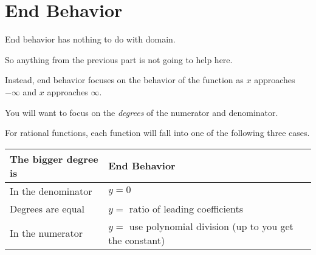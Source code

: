 %

\iffalse 

(a) 
Domain: $x \neq -7, 2$
Hole @ (2, 11/9)
Vertical asymptote: $x = -7$

(b)
Domain: $x \neq 1/2, -4/5$
Hole @ (1/2, 7/26)
Vertical asymptote: $x = -4/5$

(c)
Domain: $x \neq 0, -3, 9$
No holes
Vertical asymptotes: $x = 0$, $x = -3$, $x = 9$

\fi 

\section{End Behavior}

End behavior has nothing to do with domain. \newline

So anything from the previous part is not going to help here. \newline 

Instead, end behavior focuses on the behavior of the function as $x$ approaches $-\infty$ and $x$ approaches $\infty$. \newline 

You will want to focus on the \emph{degrees} of the numerator and denominator. \newline 

For rational functions, each function will fall into one of the following three cases.

\begin{center}
\begin{tabular}{l|l}
\textbf{The bigger degree is} & \textbf{End Behavior} \\ \hline
In the denominator & $y = 0$    \\
Degrees are equal   & $y = $ ratio of leading coefficients \\
In the numerator    & $y = $ use polynomial division (up to you get the constant) \\
\end{tabular}
\end{center}

